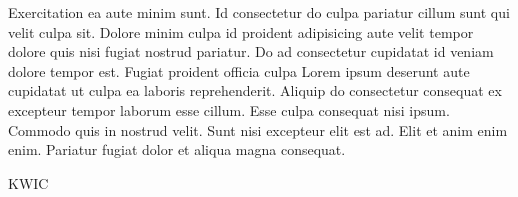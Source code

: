 
\FPmul{}%
\FPmul{}

Exercitation ea aute minim sunt. Id consectetur do culpa pariatur cillum sunt qui velit culpa sit. Dolore minim culpa id proident adipisicing aute velit tempor dolore quis nisi fugiat nostrud pariatur. Do ad consectetur cupidatat id veniam dolore tempor est. Fugiat proident officia culpa Lorem ipsum deserunt aute cupidatat ut culpa ea laboris reprehenderit. Aliquip do consectetur consequat ex excepteur tempor laborum esse cillum. Esse culpa consequat nisi ipsum. Commodo quis in nostrud velit. Sunt nisi excepteur elit est ad. Elit et anim enim enim. Pariatur fugiat dolor et aliqua magna consequat.





\vspace{\myLineheight}\begin{multicols}{2}\raggedcolumns{}

\end{multicols}


{\mktsHTwo{}KWIC\mktsHTwoBeg}%


\vspace{\myLineheight}\begin{multicols}{2}\raggedcolumns{}\end{multicols}



\begingroup\mktsObeyAllLines{}

